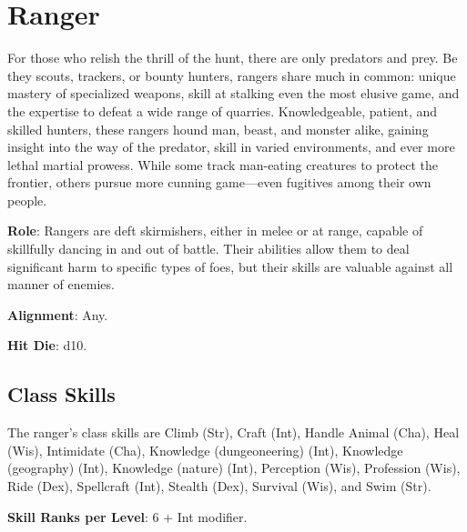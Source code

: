 \section{Ranger}

\label{f0}				
For those who relish the thrill of the hunt, there are only predators and prey. Be they scouts, trackers, or bounty hunters, rangers share much in common: unique mastery of specialized weapons, skill at stalking even the most elusive game, and the expertise to defeat a wide range of quarries. Knowledgeable, patient, and skilled hunters, these rangers hound man, beast, and monster alike, gaining insight into the way of the predator, skill in varied environments, and ever more lethal martial prowess. While some track man-eating creatures to protect the frontier, others pursue more cunning game---even fugitives among their own people.
				
\textbf{Role}: Rangers are deft skirmishers, either in melee or at range, capable of skillfully dancing in and out of battle. Their abilities allow them to deal significant harm to specific types of foes, but their skills are valuable against all manner of enemies.
				
\textbf{Alignment}: Any.
				
\textbf{Hit Die}: d10.
				
\subsection{Class Skills}

				
The ranger's class skills are Climb (Str), Craft (Int), Handle Animal (Cha), Heal (Wis), Intimidate (Cha), Knowledge (dungeoneering) (Int), Knowledge (geography) (Int), Knowledge (nature) (Int), Perception (Wis), Profession (Wis), Ride (Dex), Spellcraft (Int), Stealth (Dex), Survival (Wis), and Swim (Str).
				
\textbf{Skill Ranks per Level}: 6 + Int modifier.

